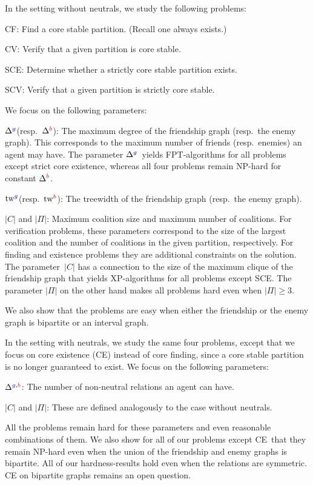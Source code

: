 \documentclass[a4paper,fleqn]{cas-sc}
\newcommand{\friendshipColor}{blue}
\newcommand{\enemyColor}{red}
\newcommand{\agent}{agent\xspace}
\newcommand{\partition}{\ensuremath{\Pi}\xspace}
\newcommand{\coalition}{\ensuremath{C}\xspace}
\newcommand{\friendSuperscript}{{\color{\friendshipColor}g}}
\newcommand{\enemySuperscript}{{\color{\enemyColor}b}}
\newcommand{\CE}{CE\xspace}
\newcommand{\SCE}{SCE\xspace}
\newcommand{\SCV}{SCV\xspace}
\newcommand{\CF}{CF\xspace}
\newcommand{\CV}{CV\xspace}
\newcommand{\maxDegree}{\ensuremath{\Delta}}
\newcommand{\maxDegreeFriend}{\ensuremath{\maxDegree^{\friendSuperscript}}\xspace}
\newcommand{\maxDegreeEnemy}{\ensuremath{\maxDegree^{\enemySuperscript}}\xspace}
\newcommand{\maxDegreeFE}{\ensuremath{\maxDegree^{\friendSuperscript,\enemySuperscript}}\xspace}
\newcommand{\treewidth}{\ensuremath{\text{tw}}}
\newcommand{\treewidthFriend}{\ensuremath{\treewidth^{\friendSuperscript}}\xspace}
\newcommand{\treewidthEnemy}{\ensuremath{\treewidth^{\enemySuperscript}}\xspace}
\newcommand{\maxCoalitionSize}{\ensuremath{|\coalition|}\xspace}
\newcommand{\maxNumberOfCoalitions}{\ensuremath{|\partition|}\xspace}
\begin{document}
In the setting without neutrals, we study the following problems:
\begin{compactitem}
\item \CF: Find a core stable partition. (Recall one always exists.)
\item \CV: Verify that a given partition is core stable.
\item \SCE: Determine whether a strictly core stable partition exists.
\item \SCV: Verify that a given partition is strictly core stable.
\end{compactitem}
We focus on the following parameters:
\begin{compactitem}
\item \maxDegreeFriend (resp.\ \maxDegreeEnemy): The maximum degree of the friendship graph (resp.\ the enemy graph). This corresponds to the maximum number of friends (resp.\ enemies) an agent may have. 
The parameter \maxDegreeFriend\ yields FPT-algorithms for all problems except strict core existence, whereas all four problems remain NP-hard for constant \maxDegreeEnemy.
\item \treewidthFriend (resp.\ \treewidthEnemy): The treewidth of the friendship graph (resp.\ the enemy graph). 
\item \maxCoalitionSize and \maxNumberOfCoalitions:
Maximum coalition size and maximum number of coalitions. 
For verification problems, these parameters correspond to the size of the largest coalition and the number of coalitions  in the given partition, respectively. For finding and existence problems they are additional constraints on the solution. 
The parameter~\maxCoalitionSize has a connection to the size of the maximum clique of the friendship graph that yields  XP-algorithms for all problems except \SCE.
The parameter \maxNumberOfCoalitions on the other hand makes all problems hard even when $\maxNumberOfCoalitions \geq 3$.
\end{compactitem}
We also show that the problems are easy when either the friendship or the enemy graph is bipartite or an interval graph.

In the setting with neutrals, we study the same four problems, except that we focus on core existence (\CE) instead of core finding, since a core stable partition is no longer guaranteed to exist.
We focus on the following parameters:
\begin{compactitem}
\item \maxDegreeFE: The number of non-neutral relations an \agent can have.
\item \maxCoalitionSize and \maxNumberOfCoalitions: These are defined analogously to the case without neutrals.
\end{compactitem}
All the problems remain hard for these parameters and even reasonable combinations of them.
We also show for all of our problems except \CE\ that they remain NP-hard even when the union of the friendship and enemy graphs is bipartite.
All of our hardness-results hold even when the relations are symmetric.
\CE on bipartite graphs remains an open question.
\end{document}
